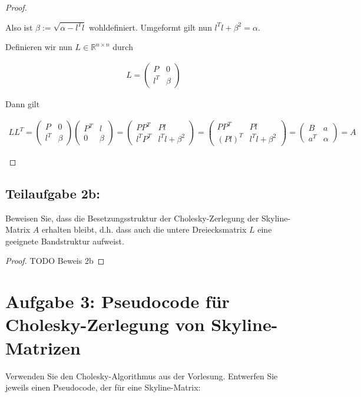 \documentclass[]{article}
\begin{document}
\begin{proof}
\begin{itemize}
		Also ist $\beta := \sqrt{\alpha - l^Tl}$ wohldefiniert. Umgeformt gilt nun $l^Tl + \beta^2 = \alpha$.
		
		Definieren wir nun $L \in \mathbb{R}^{n\times n}$ durch
		
		\begin{align*}
			L = \begin{pmatrix}
				P & 0 \\
				l^T & \beta
			\end{pmatrix}
		\end{align*}
	
		Dann gilt
		
		\begin{align*}
			LL^T = \begin{pmatrix}
				P & 0 \\
				l^T & \beta
			\end{pmatrix} \begin{pmatrix}
				P^T & l \\
				0 & \beta
			\end{pmatrix} = \begin{pmatrix}
				PP^T & Pl \\
				l^TP^T & l^Tl+\beta^2
			\end{pmatrix} = \begin{pmatrix}
				PP^T & Pl \\
				(Pl)^T & l^Tl+\beta^2
			\end{pmatrix} = \begin{pmatrix}
				B & a \\
				a^T & \alpha
			\end{pmatrix} = A
		\end{align*}
	\end{itemize}
	
\end{proof}

\subsection*{Teilaufgabe 2b:}
Beweisen Sie, dass die Besetzungsstruktur der Cholesky-Zerlegung der Skyline-Matrix $A$ erhalten bleibt, d.h. dass auch die untere Dreiecksmatrix $L$ eine geeignete Bandstruktur aufweist.

\begin{proof}
	TODO Beweis 2b
\end{proof}

\section*{Aufgabe 3: Pseudocode für Cholesky-Zerlegung von Skyline-Matrizen}
Verwenden Sie den Cholesky-Algorithmus aus der Vorlesung. Entwerfen Sie jeweils einen Pseudocode, der für eine Skyline-Matrix:
\end{document}

